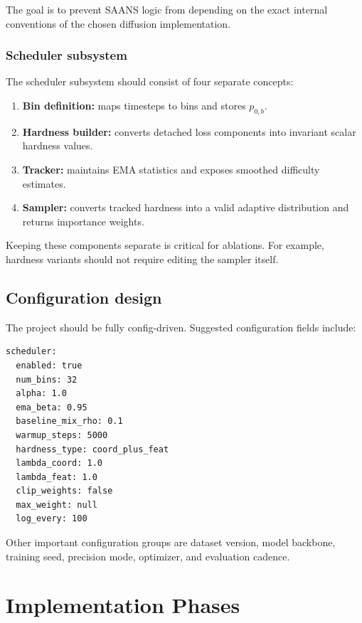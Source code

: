 \documentclass[11pt]{report}
\begin{document}
The goal is to prevent SAANS logic from depending on the exact internal conventions of the chosen diffusion implementation.

\subsection{Scheduler subsystem}

The scheduler subsystem should consist of four separate concepts:

\begin{enumerate}[leftmargin=2em]
    \item \textbf{Bin definition:} maps timesteps to bins and stores $p_{0,b}$.
    \item \textbf{Hardness builder:} converts detached loss components into invariant scalar hardness values.
    \item \textbf{Tracker:} maintains EMA statistics and exposes smoothed difficulty estimates.
    \item \textbf{Sampler:} converts tracked hardness into a valid adaptive distribution and returns importance weights.
\end{enumerate}

Keeping these components separate is critical for ablations. For example, hardness variants should not require editing the sampler itself.

\section{Configuration design}

The project should be fully config-driven. Suggested configuration fields include:

\begin{lstlisting}[style=codeblock]
scheduler:
  enabled: true
  num_bins: 32
  alpha: 1.0
  ema_beta: 0.95
  baseline_mix_rho: 0.1
  warmup_steps: 5000
  hardness_type: coord_plus_feat
  lambda_coord: 1.0
  lambda_feat: 1.0
  clip_weights: false
  max_weight: null
  log_every: 100
\end{lstlisting}

Other important configuration groups are dataset version, model backbone, training seed, precision mode, optimizer, and evaluation cadence.

\chapter{Implementation Phases}
\end{document}
